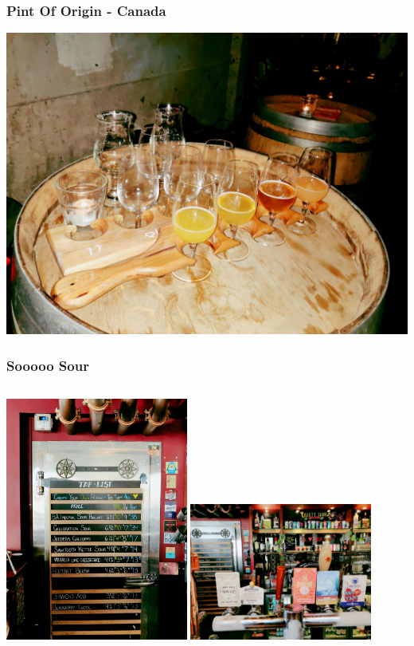 \documentclass[12pt]{beamer}
\begin{document}
    \begin{frame}
        \frametitle{Pint Of Origin - Canada}
        \includegraphics[height=0.80\textheight,width=1\textwidth]{img/canada-poo.jpg}
    \end{frame}

    \begin{frame}
        \frametitle{Sooooo Sour}
        \begin{columns}
            \begin{center}
                \includegraphics[height=0.80\textheight,width=0.45\textwidth]{img/sour-only.jpg}
                \includegraphics[height=0.80\textheight,width=0.45\textwidth]{img/sour-only-2.jpg}
            \end{center}
        \end{columns}
    \end{frame}
\end{document}

